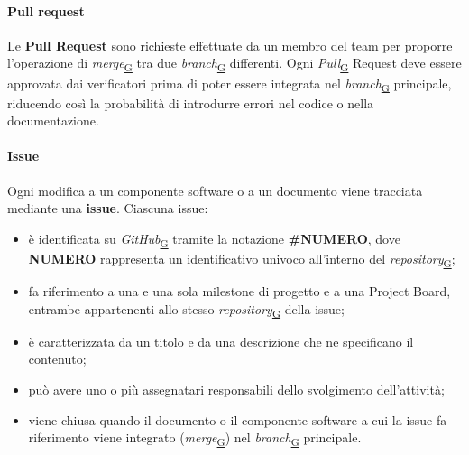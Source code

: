 \documentclass[a4paper,12pt]{article}
\begin{document}
            \paragraph{Pull request}\hfill\break
            \label{par:pullrequest}
            Le \textbf{Pull Request} sono richieste effettuate da un membro del team per proporre l'operazione di \textit{merge}\textsubscript{\href{https://atlasteam9.github.io/Atlas/glossario.html\#Merge}{G}} tra due \textit{branch}\textsubscript{\href{https://atlasteam9.github.io/Atlas/glossario.html\#Branch}{G}} differenti. Ogni \textit{Pull}\textsubscript{\href{https://atlasteam9.github.io/Atlas/glossario.html\#Pull}{G}} Request deve essere approvata dai verificatori prima di poter essere integrata nel \textit{branch}\textsubscript{\href{https://atlasteam9.github.io/Atlas/glossario.html\#Branch}{G}} principale, riducendo così la probabilità di introdurre errori nel codice o nella documentazione.
            
            \paragraph{Issue}\hfill\break
            Ogni modifica a un componente software o a un documento viene tracciata mediante una \textbf{issue}. Ciascuna issue:
            \begin{itemize}
                \item è identificata su \textit{GitHub}\textsubscript{\href{https://atlasteam9.github.io/Atlas/glossario.html\#GitHub}{G}} tramite la notazione \textbf{\#NUMERO}, dove \textbf{NUMERO} rappresenta un identificativo univoco all'interno del \textit{repository}\textsubscript{\href{https://atlasteam9.github.io/Atlas/glossario.html\#Repository}{G}};
                \item fa riferimento a una e una sola milestone di progetto e a una Project Board, entrambe appartenenti allo stesso \textit{repository}\textsubscript{\href{https://atlasteam9.github.io/Atlas/glossario.html\#Repository}{G}} della issue;
                \item è caratterizzata da un titolo e da una descrizione che ne specificano il contenuto;
                \item può avere uno o più assegnatari responsabili dello svolgimento dell'attività;
                \item viene chiusa quando il documento o il componente software a cui la issue fa riferimento viene integrato (\textit{merge}\textsubscript{\href{https://atlasteam9.github.io/Atlas/glossario.html\#Merge}{G}}) nel \textit{branch}\textsubscript{\href{https://atlasteam9.github.io/Atlas/glossario.html\#Branch}{G}} principale.
            \end{itemize}
\end{document}
